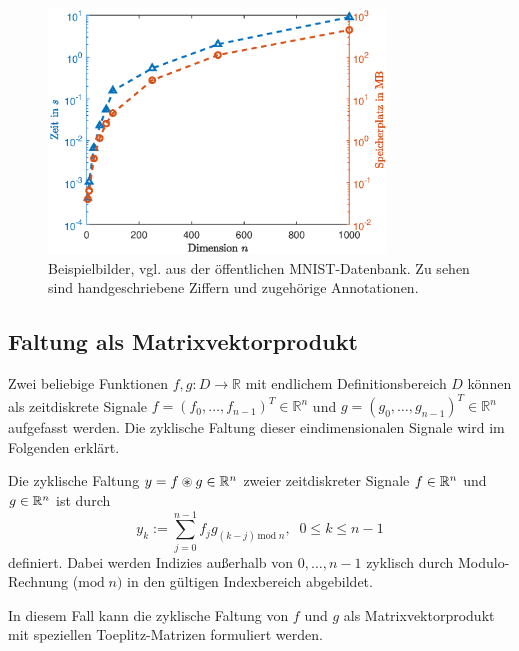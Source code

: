 

\begin{figure}[h]
    \includegraphics[width=0.8\textwidth]{pics/chapters/kap5/data_plot_naive_verb_verb.eps}
    \centering
    \caption{Beispielbilder, vgl. \cite{DBLP:journals/pieee/LeCunBBH98} aus der öffentlichen MNIST-Datenbank. Zu sehen sind handgeschriebene Ziffern und zugehörige Annotationen.}
    \label{mnistpiccc}
\end{figure}

\subsection{Faltung als Matrixvektorprodukt}
\label{abs:conv_using_sparse}
Zwei beliebige Funktionen $f,g: D \rightarrow \mathbb{R}$ mit endlichem Definitionsbereich $D$ können als zeitdiskrete Signale $f=(f_0, \ldots, f_{n-1})^T \in \mathbb{R}^{n}$ und $g=(g_0, \ldots, g_{n-1})^T \in \mathbb{R}^{n}$ aufgefasst werden. %
Die zyklische Faltung dieser eindimensionalen Signale wird im Folgenden erklärt.

\begin{defi}
    \label{def:cycconv}
    Die zyklische Faltung $y=f \circledast g \in \mathbb{R}^{n}$ zweier zeitdiskreter Signale $f \in \mathbb{R}^n$ und $g \in \mathbb{R}^n$ ist durch
    \begin{equation*}
        y_k:=\sum_{j=0}^{n-1} f_j g_{(k-j) \, \mathrm{mod} \; n},  \; \; 0 \leq k \leq n-1
    \end{equation*}
    definiert. Dabei werden Indizies außerhalb von $0, \ldots, n-1$ zyklisch durch Modulo-Rechnung ($\mathrm{mod} \; n)$ in den gültigen Indexbereich abgebildet.
\end{defi}
In diesem Fall kann die zyklische Faltung von $f$ und $g$ als Matrixvektorprodukt mit speziellen Toeplitz-Matrizen formuliert werden. 

